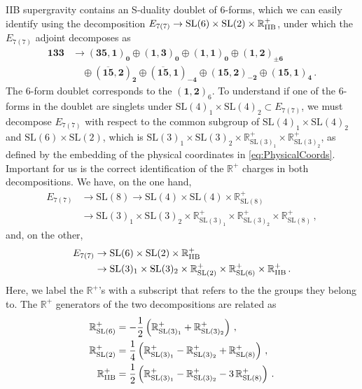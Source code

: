 \documentclass[a4paper, 11pt]{article}
\numberwithin{equation}{section}
\newcommand{\SL}[1]{\mathrm{SL}( #1 )}
\newcommand{\En}[1]{E_{#1(#1)}}
\newcommand{\+}{\oplus}
\newcommand{\RO}{\mathbb{R}^+_{\SL{3}_1}}
\newcommand{\RT}{\mathbb{R}^+_{\SL{3}_2}}
\begin{document}
IIB supergravity contains an S-duality doublet of 6-forms, which we can easily identify using the decomposition $\En{7} \rightarrow \SL{6} \times \SL{2} \times \mathbb{R}^+_{\rm IIB}$, under which the $\En{7}$ adjoint decomposes as
\begin{equation} \label{eq:AdjointSL6}
	\begin{split}
		\mathbf{133} &\rightarrow \mathbf{\left(35,1\right)_0} \oplus \mathbf{\left(1,3\right)_0} \oplus \mathbf{\left(1,1\right)_0} \oplus \mathbf{\left(1,2\right)_{\pm 6}} \\
		& \quad \oplus \mathbf{\left(\overline{15},2\right)_2} \oplus \mathbf{\left(\overline{15},1\right)_{-4}} \oplus \mathbf{\left(15,2\right)_{-2}} \oplus \mathbf{\left(15,1\right)_4} \,.
	\end{split}
\end{equation}
The 6-form doublet corresponds to the $\mathbf{\left(1,2\right)}_{6}$. To understand if one of the 6-forms in the doublet are singlets under $\SL{4}_1 \times \SL{4}_2 \subset \En{7}$, we must decompose $\En{7}$ with respect to the common subgroup of $\SL{4}_1 \times \SL{4}_2$ and $\SL{6} \times \SL{2}$, which is $\SL{3}_1 \times \SL{3}_2 \times \RO \times \RT$, as defined by the embedding of the physical coordinates in \eqref{eq:PhysicalCoords}. Important for us is the correct identification of the $\mathbb{R}^+$ charges in both decompositions. We have, on the one hand,
\begin{equation} \label{eq:SL4SL4}
	\begin{split}
		\En{7} &\rightarrow \SL{8} \rightarrow \SL{4} \times \SL{4} \times \mathbb{R}^+_{\SL{8}} \\
		&\rightarrow \SL{3}_1 \times \SL{3}_2 \times \RO \times \RT \times \mathbb{R}^+_{\SL{8}} \,,
	\end{split}
\end{equation}
and, on the other,
\begin{equation} \label{eq:SL6SL2}
	\begin{split}
		\En{7} &\rightarrow \SL{6} \times \SL{2} \times \mathbb{R}^+_{\rm IIB} \\
		&\rightarrow \SL{3}_1 \times \SL{3}_2 \times \mathbb{R}^+_{\SL{2}} \times \mathbb{R}^+_{\SL{6}} \times \mathbb{R}^+_{\rm IIB} \,.
	\end{split}
\end{equation}
Here, we label the $\mathbb{R}^+$'s with a subscript that refers to the the groups they belong to. The $\mathbb{R}^+$ generators of the two decompositions are related as
\begin{equation} \label{eq:R+charges}
	\begin{split}
		\mathbb{R}^+_{\SL{6}} &= - \frac12 \left( \RO + \RT \right) \,, \\
		\mathbb{R}^+_{\SL{2}} &= \frac14 \left( \RO - \RT + \mathbb{R}^+_{\SL{8}} \right) \,, \\
		\mathbb{R}^+_{\rm IIB} &= \frac12 \left( \RO - \RT - 3\, \mathbb{R}^+_{\SL{8}} \right) \,.
	\end{split}
\end{equation}
\end{document}
